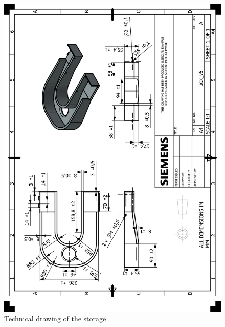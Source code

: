 \documentclass[12pt]{report}
\begin{document}
\begin{appendices}
\begin{figure}[H]
    \centering
    \includegraphics[width=\textwidth]{HP_box_v5.png} 
    \caption{Technical drawing of the storage}
    \label{fig:technical-drawing}
\end{figure}


\end{appendices}
\end{document}
